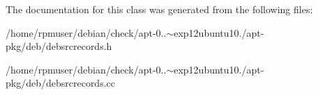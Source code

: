 \-The documentation for this class was generated from the following files\-:\begin{DoxyCompactItemize}
\item 
/home/rpmuser/debian/check/apt-\/0..$\sim$exp12ubuntu10./apt-\/pkg/deb/debsrcrecords.\-h\item 
/home/rpmuser/debian/check/apt-\/0..$\sim$exp12ubuntu10./apt-\/pkg/deb/debsrcrecords.\-cc\end{DoxyCompactItemize}
